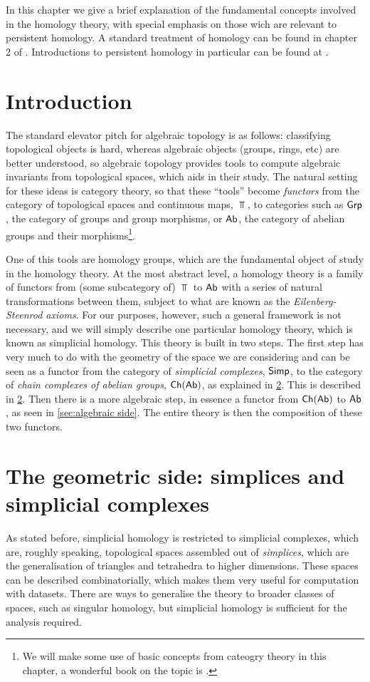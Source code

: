 \documentclass[../main.tex]{subfiles}
\begin{document}
In this chapter we give a brief explanation of the fundamental concepts involved in the
homology theory, with special emphasis on those wich are relevant to persistent
homology. A standard treatment of homology can be found in chapter 2 of \cite{hatcher}.
Introductions to persistent homology in particular can be found at \cite{edelsbrunner08,
edelsbrunner12, edelsbrunner16}. 

\section{Introduction}
The standard elevator pitch for algebraic topology is as follows: classifying topological
objects is hard, whereas algebraic objects (groups, rings, etc) are better understood, so
algebraic topology provides tools to compute algebraic invariants from topological spaces,
which aids in their study. The natural setting for these ideas is category theory, so that
these ``tools'' become \emph{functors} from the category of topological spaces and
continuous maps, \( \Top \), to categories such as \( \mathsf{Grp} \), the category of groups and
group morphisms, or \( \mathsf{Ab} \), the category of abelian groups and their
morphisms\footnote{We will make some use of basic concepts from cateogry theory in this
chapter, a wonderful book on the topic is \cite{riehl}.}.

One of this tools are homology groups, which are the fundamental object of study in the
homology theory. At the most abstract level, a homology theory is a family of
functors from (some subcategory of) \( \Top \) to \( \mathsf{Ab} \) with a series of natural
transformations between them, subject to what are known as the \emph{Eilenberg-Steenrod
axioms}. For our purposes, however, such a general framework is not necessary, and we will
simply describe one particular homology theory, which is known as simplicial homology.
This theory is built in two steps. The first step has very much to do with the geometry of
the space we are considering and can be seen as a functor from the category of
\emph{simplicial complexes}, \( \mathsf{Simp} \), to the category of \emph{chain complexes of
abelian groups}, \( \mathsf{Ch}(\mathsf{Ab}) \), as explained in \cref{sec:geometric side}. This is
described in \cref{sec:geometric side}. Then there is a more algebraic step, in essence a
functor from \( \mathsf{Ch}(\mathsf{Ab}) \) to \( \mathsf{Ab} \), as seen in \cref{sec:algebraic side}. The entire
theory is then the composition of these two functors. 

\section{The geometric side: simplices and simplicial complexes}\label{sec:geometric side}
As stated before, simplicial homology is restricted to simplicial complexes, which are,
roughly speaking, topological spaces assembled out of \emph{simplices}, which are the
generalisation of triangles and tetrahedra to higher dimensions. These spaces can be
described combinatorially, which makes them very useful for computation with datasets.
There are ways to generalise the theory to broader classes of spaces, such as singular
homology, but simplicial homology is sufficient for the analysis required. 
\end{document}
